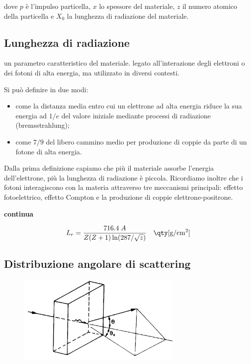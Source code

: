 dove $p$ è l'impulso particella, $x$ lo spessore del materiale, $z$ il numero atomico della particella e $X_0$ la lunghezza di radiazione del materiale.

\subsection{Lunghezza di radiazione}

\E un parametro caratteristico del materiale. \E legato all'interazione degli elettroni o dei fotoni di alta energia, ma utilizzato in diversi contesti.

Si può definire in due modi:

\begin{itemize}
    \item come la distanza media entro cui un elettrone ad alta energia riduce la sua energia ad $1/e$ del valore iniziale mediante processi di radiazione (bremsstrahlung);
    \item come $7/9$ del libero cammino medio per produzione di coppie da parte di un fotone di alta energia.
\end{itemize}

Dalla prima definizione capiamo che più il materiale assorbe l'energia dell'elettrone, più la lunghezza di radiazione è piccola. Ricordiamo inoltre che i fotoni interagiscono con la materia attraverso tre meccanismi principali: effetto fotoelettrico, effetto Compton e la produzione di coppie elettrone-positrone.

\textbf{continua}

$$L_r=\frac{716.4 \; A}{Z(Z+1)\ln(287/\sqrt{z})}
\quad \rm \qty[g/cm^2]$$

\subsection{Distribuzione angolare di scattering}

\begin{figure}[H]
    \centering
    \includegraphics[width=8cm]{immagini/distribuzione_angolare_di_scattering.png}
\end{figure}

